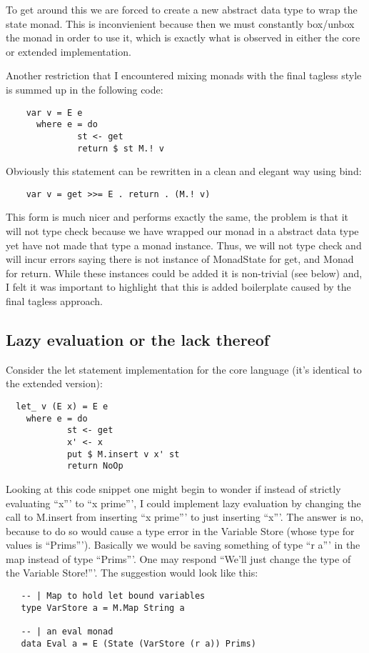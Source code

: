 \documentclass[9pt,letterpaper]{extarticle}
\begin{document}
  To get around this we are forced to create a new abstract data type to wrap
  the state monad. This is inconvienient because then we must constantly
  box/unbox the monad in order to use it, which is exactly what is observed in
  either the core or extended implementation.

  Another restriction that I encountered mixing monads with the final tagless
  style is summed up in the following code:

  \begin{verbatim}
    var v = E e 
      where e = do
              st <- get
              return $ st M.! v
  \end{verbatim}

  Obviously this statement can be rewritten in a clean and elegant way using
  bind: 
  \begin{verbatim}
    var v = get >>= E . return . (M.! v)
  \end{verbatim}

  This form is much nicer and performs exactly the same, the problem is that it
  will not type check because we have wrapped our monad in a abstract data type
  yet have not made that type a monad instance. Thus, we will not type check and
  will incur errors saying there is not instance of MonadState for get, and
  Monad for return. While these instances could be added it is non-trivial (see
  below) and, I felt it was important to highlight that this is added
  boilerplate caused by the final tagless approach.

  \subsection{Lazy evaluation or the lack thereof}
  Consider the let statement implementation for the core language (it's
  identical to the extended version):
  \begin{verbatim}
  let_ v (E x) = E e
    where e = do
            st <- get
            x' <- x
            put $ M.insert v x' st
            return NoOp
  \end{verbatim}

  Looking at this code snippet one might begin to wonder if instead of strictly
  evaluating ``x''' to ``x prime''', I could implement lazy evaluation by changing
  the call to M.insert from inserting ``x prime''' to just inserting ``x'''. The
  answer is no, because to do so would cause a type error in the Variable
  Store (whose type for values is ``Prims'''). Basically we would be saving
  something of type ``r a''' in the map instead of type ``Prims'''. One may
  respond ``We'll just change the type of the Variable Store!'''. The suggestion
  would look like this:
  \begin{verbatim}
   -- | Map to hold let bound variables
   type VarStore a = M.Map String a
   
   -- | an eval monad
   data Eval a = E (State (VarStore (r a)) Prims) 
  \end{verbatim}
\end{document}
